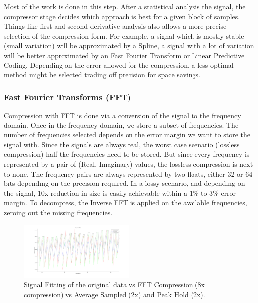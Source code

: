 \documentclass[conference]{IEEEtran}
\begin{document}
Most of the work is done in this step. 
After a statistical analysis the signal, the compressor stage decides which approach is best for a given block of samples.
Things like first and second derivative analysis also allows a more precise selection of the compression form. 
For example, a signal which is mostly stable (small variation) will be approximated by a Spline, a signal with a lot of variation will be better approximated by an Fast Fourier Transform or Linear Predictive Coding.
Depending on the error allowed for the compression, a less optimal method might be selected trading off precision for space savings. 

\vspace{10pt}
\subsubsection{Fast Fourier Transforms (FFT)}

Compression with FFT is done via a conversion of the signal to the frequency domain. Once in the frequency domain, we store a subset of frequencies.
The number of frequencies selected depends on the error margin we want to store the signal with. Since the signals are always real, the worst case scenario (lossless compression) half the frequencies need to be stored.
But since every frequency is represented by a pair of (Real, Imaginary) values, the lossless compression is next to none. 
The frequency pairs are always represented by two floats, either 32 or 64 bits depending on the precision required.
In a lossy scenario, and depending on the signal, 10x reduction in size is easily achievable within a 1\% to 3\% error margin.
To decompress, the Inverse FFT is applied on the available frequencies, zeroing out the missing frequencies.

\begin{figure}[ht]
  \centering
  \includegraphics[width=0.5\textwidth]{FFT_Comparison.png}
  \caption{Signal Fitting of the original data vs FFT Compression (8x compression) vs Average Sampled (2x) and Peak Hold (2x).}
  \label{fft_comparison}
\end{figure}
\vspace{5pt}
\end{document}
